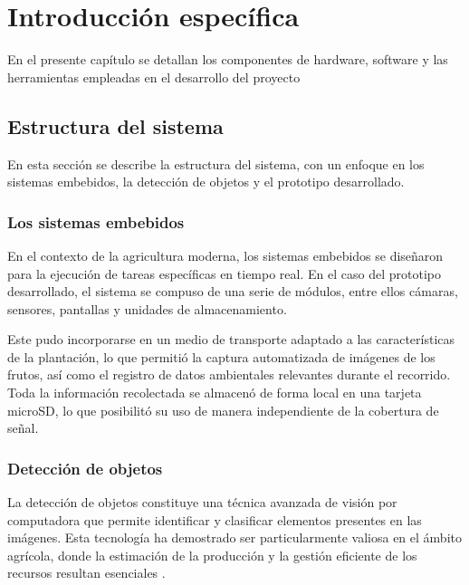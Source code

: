 \chapter{Introducción específica} %

\label{Chapter2}

En el presente capítulo se detallan los componentes de hardware, software y las herramientas empleadas en el desarrollo del proyecto

\section{Estructura del sistema}

En esta sección se describe la estructura del sistema, con un enfoque en los sistemas embebidos, la detección de objetos y el prototipo desarrollado.

\subsection{Los sistemas embebidos}

En el contexto de la agricultura moderna, los sistemas embebidos se diseñaron para la ejecución de tareas específicas en tiempo real. En el caso del prototipo desarrollado, el sistema se compuso de una serie de módulos, entre ellos cámaras, sensores, pantallas y unidades de almacenamiento. 

Este pudo incorporarse en un medio de transporte adaptado a las características de la plantación, lo que permitió la captura automatizada de imágenes de los frutos, así como el registro de datos ambientales relevantes durante el recorrido. Toda la información recolectada se almacenó de forma local en una tarjeta microSD, lo que posibilitó su uso de manera independiente de la cobertura de señal.

\subsection{Detección de objetos}

La detección de objetos constituye una técnica avanzada de visión por computadora que permite identificar y clasificar elementos presentes en las imágenes. Esta tecnología ha demostrado ser particularmente valiosa en el ámbito agrícola, donde la estimación de la producción y la gestión eficiente de los recursos resultan esenciales \citep{Lim2020}.

